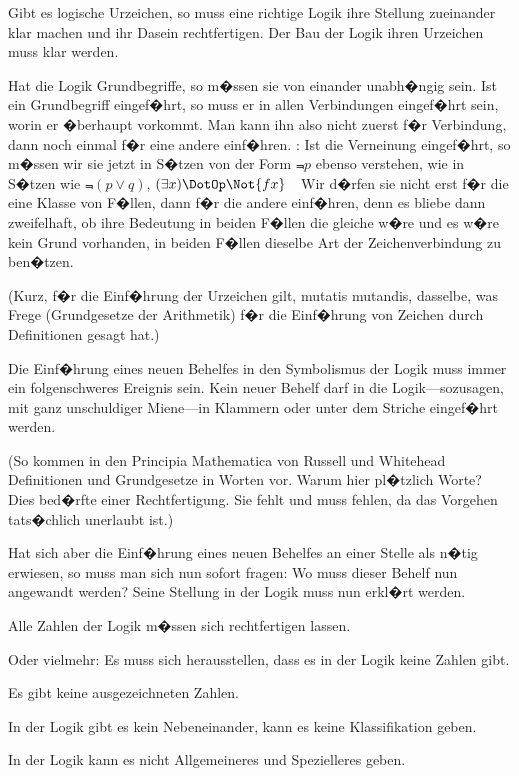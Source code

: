 {Gibt es logische Urzeichen, so muss eine richtige
Logik ihre Stellung zueinander klar machen und
ihr Dasein rechtfertigen. Der Bau der Logik 
ihren Urzeichen muss klar werden.}


{Hat die Logik Grundbegriffe, so m�ssen sie von
einander unabh�ngig sein. Ist ein Grundbegriff
eingef�hrt, so muss er in allen Verbindungen
eingef�hrt sein, worin er �berhaupt vorkommt. Man
kann ihn also nicht zuerst f�r  Verbindung,
dann noch einmal f�r eine andere einf�hren.
\ZumBeispiel: Ist die Verneinung eingef�hrt, so m�ssen
wir sie jetzt in S�tzen von der Form \glqq{}$\Not{p}$\grqq{} ebenso
verstehen, wie in S�tzen wie \glqq{}$\Not{(p \lor q)}$\grqq{}, \glqq{}$(\exists x) \DotOp \Not{fx}$\grqq{}~\undAndere\
Wir d�rfen sie nicht erst f�r die eine Klasse
von F�llen, dann f�r die andere einf�hren, denn es
bliebe dann zweifelhaft, ob ihre Bedeutung in beiden
F�llen die gleiche w�re und es w�re kein Grund
vorhanden, in beiden F�llen dieselbe Art der
Zeichenverbindung zu ben�tzen.

(Kurz, f�r die Einf�hrung der Urzeichen gilt,
mutatis mutandis, dasselbe, was Frege (\glqq{}Grundgesetze
der Arithmetik\grqq{}) f�r die Einf�hrung von
Zeichen durch Definitionen gesagt hat.)}


{Die Einf�hrung eines neuen Behelfes in den Symbolismus
der Logik muss immer ein folgenschweres
Ereignis sein. Kein neuer Behelf darf in die Logik---sozusagen,
mit ganz unschuldiger Miene---in Klammern
oder unter dem Striche eingef�hrt werden.

(So kommen in den \glqq{}Principia Mathematica\grqq{}
von Russell und Whitehead Definitionen und
Grundgesetze in Worten vor. Warum hier pl�tzlich
Worte? Dies bed�rfte einer Rechtfertigung.
Sie fehlt und muss fehlen, da das Vorgehen tats�chlich
unerlaubt ist.)

Hat sich aber die Einf�hrung eines neuen
Behelfes an einer Stelle als n�tig erwiesen, so muss
man sich nun sofort fragen: Wo muss dieser
Behelf nun  angewandt werden? Seine
Stellung in der Logik muss nun erkl�rt werden.}


{Alle Zahlen der Logik m�ssen sich rechtfertigen
lassen.

Oder vielmehr: Es muss sich herausstellen,
dass es in der Logik keine Zahlen gibt.

Es gibt keine ausgezeichneten Zahlen.}


{In der Logik gibt es kein Nebeneinander, kann
es keine Klassifikation geben.

In der Logik kann es nicht Allgemeineres und
Spezielleres geben.}



